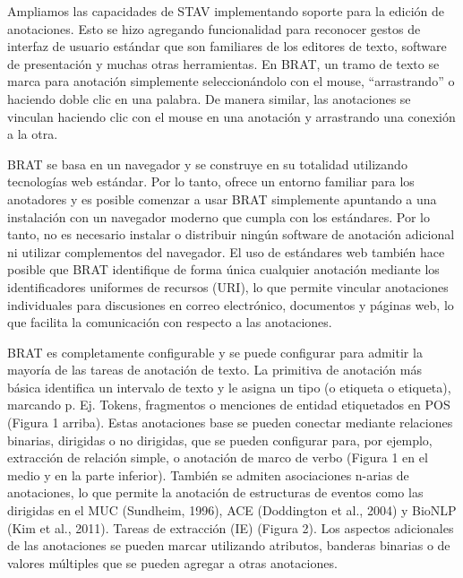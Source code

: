 Ampliamos las capacidades de STAV implementando soporte para la edición de anotaciones. Esto se hizo agregando funcionalidad para reconocer gestos de interfaz de usuario estándar que son familiares de los editores de texto, software de presentación y muchas otras herramientas.
En BRAT, un tramo de texto se marca para anotación simplemente seleccionándolo con el mouse, “arrastrando” o haciendo doble clic en una palabra. De manera similar, las anotaciones se vinculan haciendo clic con el mouse en una anotación y arrastrando una conexión a la otra.

BRAT se basa en un navegador y se construye en su totalidad utilizando tecnologías web estándar. Por lo tanto, ofrece un entorno familiar para los anotadores y es posible comenzar a usar BRAT simplemente apuntando a una instalación con un navegador moderno que cumpla con los estándares. Por lo tanto, no es necesario instalar o distribuir ningún software de anotación adicional ni utilizar complementos del navegador. El uso de estándares web también hace posible que BRAT identifique de forma única cualquier anotación mediante los identificadores uniformes de recursos (URI), lo que permite vincular anotaciones individuales para discusiones en correo electrónico, documentos y páginas web, lo que facilita la comunicación con respecto a las anotaciones.

BRAT es completamente configurable y se puede configurar para admitir la mayoría de las tareas de anotación de texto. La primitiva de anotación más básica identifica un intervalo de texto y le asigna un tipo (o etiqueta o etiqueta), marcando p. Ej. Tokens, fragmentos o menciones de entidad etiquetados en POS (Figura 1 arriba). Estas anotaciones base se pueden conectar mediante relaciones binarias, dirigidas o no dirigidas, que se pueden configurar para, por ejemplo, extracción de relación simple, o anotación de marco de verbo (Figura 1 en el medio y en la parte inferior). También se admiten asociaciones n-arias de anotaciones, lo que permite la anotación de estructuras de eventos como las dirigidas en el MUC (Sundheim, 1996), ACE (Doddington et al., 2004) y BioNLP (Kim et al., 2011). Tareas de extracción (IE) (Figura 2). Los aspectos adicionales de las anotaciones se pueden marcar utilizando atributos, banderas binarias o de valores múltiples que se pueden agregar a otras anotaciones.

